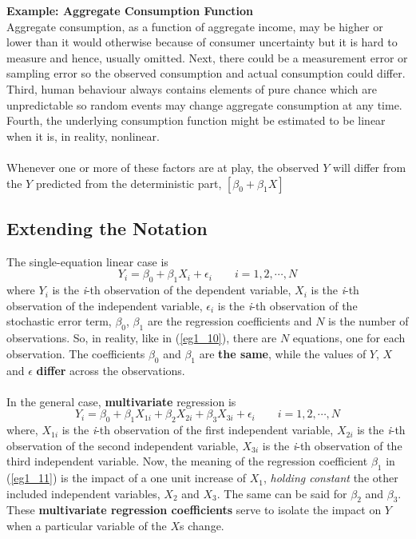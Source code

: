 \documentclass[11pt]{article}
\begin{document}
\textbf{Example: Aggregate Consumption Function}\\
Aggregate consumption, as a function of aggregate income, may be higher or lower than it would otherwise because of consumer uncertainty but it is hard to measure and hence, usually omitted. Next, there could be a measurement error or sampling error so the observed consumption and actual consumption could differ. Third, human behaviour always contains elements of pure chance which are unpredictable so random events may change aggregate consumption at any time. Fourth, the underlying consumption function might be estimated to be linear when it is, in reality, nonlinear.\\ \\
Whenever one or more of these factors are at play, the observed $Y$ will differ from the $Y$ predicted from the deterministic part, $[\beta_0+\beta_1X]$
\subsection{Extending the Notation}
The single-equation linear case is 
\begin{equation}
Y_i = \beta_0 + \beta_1X_i  + \epsilon_i \quad  \quad i=1, 2, \cdots, N \label{eg1_10}
\end{equation}
where $Y_i$ is the \textit{i}-th observation of the dependent variable, $X_i$ is the \textit{i}-th observation of the independent variable, $\epsilon_i$ is the \textit{i}-th observation of the stochastic error term, $\beta_0$, $\beta_1$ are the regression coefficients and $N$ is the number of observations. So, in reality, like in (\ref{eg1_10}), there are $N$ equations, one for each observation. The coefficients $\beta_0$ and $\beta_1$ are \textbf{\textbf{the same}}, while the values of $Y$, $X$ and $\epsilon$ \textbf{differ} across the observations.\\ \\ 
In the general case, \textbf{multivariate} regression is 
\begin{equation}
Y_i = \beta_0 + \beta_1 X_{1i} + \beta_2 X_{2i} + \beta_3 X_{3i} + \epsilon_i \quad \quad i=1, 2, \cdots, N \label{eg1_11}
\end{equation} 
where, $X_{1i}$ is the \textit{i}-th observation of the first independent variable, $X_{2i}$ is the \textit{i}-th observation of the second independent variable, $X_{3i}$ is the \textit{i}-th observation of the third independent variable. Now, the meaning of the regression coefficient $\beta_1$ in (\ref{eg1_11}) is the impact of a one unit increase of $X_1$, \textit{holding constant} the other included independent variables, $X_2$ and $X_3$. The same can be said for $\beta_2$ and $\beta_3$. These \textbf{multivariate regression coefficients} serve to isolate the impact on $Y$ when a particular variable of the $X$s change.
\end{document}
